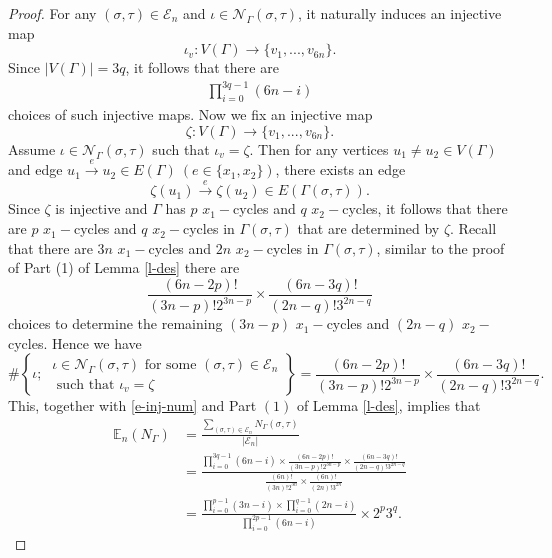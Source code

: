\documentclass{amsart}
\theoremstyle{plain}
\theoremstyle{definition}
\theoremstyle{remark}
\begin{document}
\begin{proof}
   For any $(\sigma,\tau)\in\mathcal{E}_n$ and $\iota\in\mathcal{N}_\Gamma(\sigma,\tau)$, it    naturally induces an injective map
   $$\iota_{v}:V(\Gamma)\to \{v_1,...,v_{6n}\}.$$
   Since $|V(\Gamma)|=3q$, it follows that there are
   \begin{align}\label{e-inj-num}
   \prod\limits_{i=0}^{3q-1}(6n-i)
   \end{align}
   choices of such injective maps. Now we fix an injective map $$\zeta:V(\Gamma)\to\{v_1,...,v_{6n}\}.$$
   Assume $\iota\in\mathcal{N}_\Gamma(\sigma,\tau)$ such that $\iota_v=\zeta$. Then for any vertices $u_1\neq u_2\in V(\Gamma)$ and edge $u_1\overset{e}{\to}u_2\in E(\Gamma)\ (e\in\{x_1,x_2\})$, there exists an edge 
   $$\zeta(u_1)\overset{e}{\to}\zeta(u_2)\in E(\Gamma(\sigma,\tau)).$$
   Since $\zeta$ is injective and $\Gamma$ has $p$ $x_1-$cycles and $q$ $x_2-$cycles, it follows that there are $p$ $x_1-$cycles and $q$ $x_2-$cycles in $\Gamma(\sigma,\tau)$ that are determined by $\zeta$. Recall that there are $3n$ $x_1-$cycles and $2n$ $x_2-$cycles in $\Gamma(\sigma,\tau)$, similar to the proof of Part (1) of Lemma \ref{l-des} there are $$\frac{(6n-2p)!}{(3n-p)!2^{3n-p}}\times\frac{(6n-3q)!}{(2n-q)!3^{2n-q}}$$
   choices to determine the remaining $(3n-p)$ $x_1-$cycles and $(2n-q)$ $x_2-$cycles. Hence we have 
    $$\#\left\{\iota;\ \begin{matrix}
        \iota\in\mathcal{N}_\Gamma(\sigma,\tau)\text{ for some }(\sigma,\tau)\in\mathcal{E}_n\\
        \text{ such that } \iota_v=\zeta
    \end{matrix}\right\}=\frac{(6n-2p)!}{(3n-p)!2^{3n-p}}\times\frac{(6n-3q)!}{(2n-q)!3^{2n-q}}.$$
    This, together with \eqref{e-inj-num} and Part $(1)$ of Lemma \ref{l-des}, implies that
    \begin{equation}
    \begin{aligned}\label{e-inj-1}
        \mathbb{E}_n(N_\Gamma)&=\frac{\sum\limits_{(\sigma,\tau)\in\mathcal{E}_n}N_\Gamma(\sigma,\tau)}{|\mathcal{E}_n|} \\ &=\frac{\prod\limits_{i=0}^{3q-1}(6n-i)\times\frac{(6n-2p)!}{(3n-p)!2^{3n-p}}\times\frac{(6n-3q)!}{(2n-q)!3^{2n-q}}}{\frac{(6n)!}{(3n)!2^{3n}}\times\frac{(6n)!}{(2n)!3^{2n}}}\\
        &=\frac{\prod\limits_{i=0}^{p-1}(3n-i)\times\prod\limits_{i=0}^{q-1}(2n-i)}{\prod\limits_{i=0}^{2p-1}(6n-i)}\times 2^p3^q.
    \end{aligned}
    \end{equation}

\end{proof}
\end{document}
